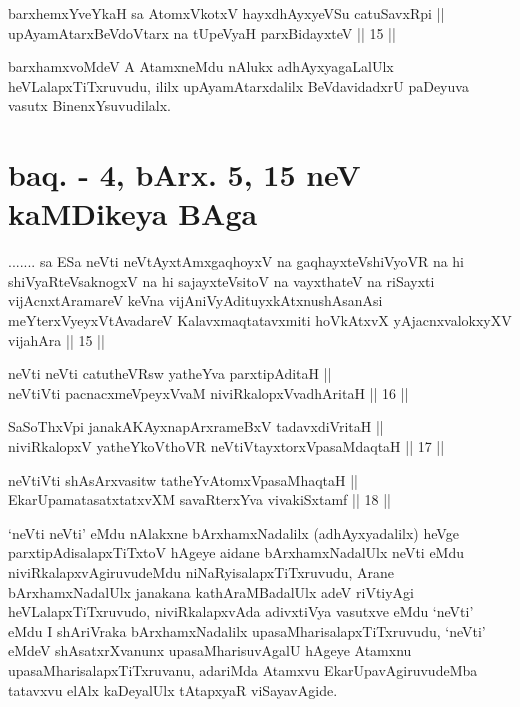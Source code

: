 \begin{shl}
barxhemxYveYkaH sa AtomxVkotxV hayxdhAyxyeVSu catuSavxRpi || \\
upAyamAtarxBeVdoV\s tarx na tUpeVyaH parxBidayxteV ||  15 ||  
\end{shl}

\begin{artha}
barxhamxvoMdeV A AtamxneMdu nAlukx adhAyxyagaLalUlx heVLalapxTiTxruvudu, ililx upAyamAtarxdalilx BeVdavidadxrU paDeyuva vasutx BinenxYsuvudilalx.
\end{artha}


\section*{baq. - 4, bArx. 5, 15 neV kaMDikeya BAga}

\begin{shl}
....... sa ESa neVti neVtAyxtAmxgaqhoyxV na gaqhayxteV\s shiVyoVR na hi shiVyaRteV\s saknogxV na hi sajayxteV\s sitoV na vayxthateV na riSayxti vijAcnxtAramareV keVna vijAniVyAdituyxkAtxnushAsanAsi meYterxVyeyxVtAvadareV Kalavxmaqtatavxmiti hoVkAtxvX yAjacnxvalokxyXV vijahAra || 15 ||
\end{shl}

\begin{shl}
neVti neVti catutheVR\s sw yatheYva parxtipAditaH || \\
neVtiVti pacnacxmeV\s peyxVvaM niviRkalopxV\s vadhAritaH ||  16 ||  
\end{shl}
				
\begin{shl}
SaSoThxV\s pi janakAKAyxnapArxrameBxV tadavxdiVritaH || \\
niviRkalopxV yatheYkoV\s thoVR  neVtiVtayxtorxVpasaMdaqtaH ||  17 ||  
\end{shl}

\begin{shl}
neVtiVti shAsArxvasitw tatheYvA\s \s tomxVpasaMhaqtaH || \\
EkarUpamatasatxtatxvXM savaRterxYva vivakiSxtamf ||  18 ||  
\end{shl}

\begin{artha}
`neVti neVti' eMdu nAlakxne bArxhamxNadalilx (adhAyxyadalilx) heVge parxtipAdisalapxTiTxtoV hAgeye aidane bArxhamxNadalUlx neVti eMdu niviRkalapxvAgiruvudeMdu niNaRyisalapxTiTxruvudu, Arane bArxhamxNadalUlx janakana kathAraMBadalUlx adeV riVtiyAgi heVLalapxTiTxruvudo, niviRkalapxvAda adivxtiVya vasutxve eMdu `neVti' eMdu I shAriVraka bArxhamxNadalilx upasaMharisalapxTiTxruvudu, `neVti' eMdeV shAsatxrXvanunx upasaMharisuvAgalU hAgeye Atamxnu upasaMharisalapxTiTxruvanu, adariMda Atamxvu EkarUpavAgiruvudeMba tatavxvu elAlx kaDeyalUlx tAtapxyaR viSayavAgide.
\end{artha}

